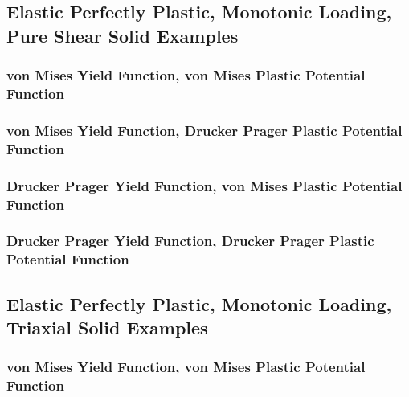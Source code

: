 \documentclass[fleqn,11pt]{article}
\begin{document}
\subsection{Elastic Perfectly Plastic, Monotonic Loading, Pure Shear Solid Examples}


\subsubsection{von Mises Yield Function, von Mises Plastic Potential Function}

\subsubsection{von Mises Yield Function, Drucker Prager Plastic Potential Function}


\subsubsection{Drucker Prager Yield Function, von Mises Plastic Potential Function}

\subsubsection{Drucker Prager Yield Function, Drucker Prager Plastic Potential Function}





\subsection{Elastic Perfectly Plastic, Monotonic Loading,  Triaxial Solid Examples}

\subsubsection{von Mises Yield Function, von Mises Plastic Potential Function}
\end{document}
